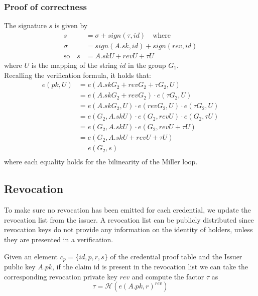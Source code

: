 \subsubsection{Proof of correctness}
The signature $s$ is given by
\begin{equation*}
\begin{split}
    s &= \sigma + sign(\tau, id) \quad \text{where} \\
    \sigma &= sign(A.sk, id) + sign(rev, id) \\
    \text{so} \quad s &= A.sk U + rev U + \tau U
\end{split}
\end{equation*}
where $U$ is the mapping of the string $id$ in the group $G_1$.\\
Recalling the verification formula, it holds that:
\begin{equation*}
\begin{split}
 e(pk, U) &= e(A.skG_2 + revG_2 + \tau G_2, U) \\
 &= e(A.skG_2 + revG_2)\cdot e(\tau G_2, U) \\
 &= e(A.skG_2, U) \cdot e(revG_2, U) \cdot e(\tau G_2, U) \\
 &= e(G_2, A.sk U) \cdot e(G_2, rev U) \cdot e(G_2, \tau U) \\
 &= e(G_2, A.sk U) \cdot e(G_2, rev U + \tau U) \\
 &= e(G_2, A.sk U + rev U + \tau U) \\
 &= e(G_2, s) \\
\end{split}
\end{equation*}
where each equality holds for the bilinearity of the Miller loop.

\subsection{Revocation}

To make sure no revocation has been emitted for each credential, we update the revocation list from the issuer. A revocation list can be publicly distributed since revocation keys do not provide any information on the identity of holders, unless they are presented in a verification.

Given an element $c_p = \{id, p, r, s \}$ of the credential proof table and the Issuer public key $A.pk$, if the claim id is present in the revocation list we can take the corresponding revocation private key $rev$ and compute the factor $\tau$ as
\begin{equation}\label{tau}
        \tau = \mathcal{H}(e(A.pk, r)^{rev})
\end{equation}

